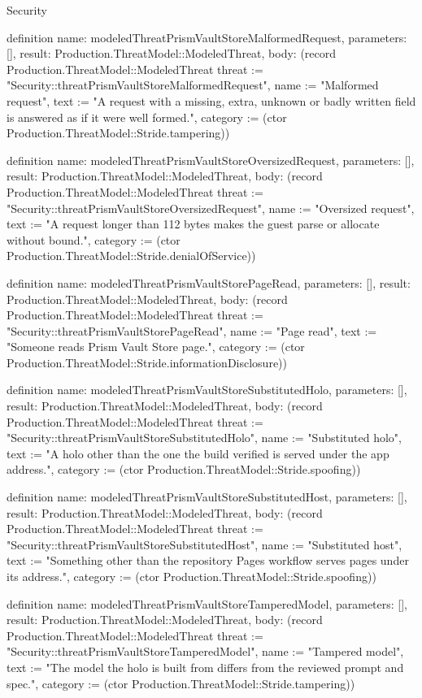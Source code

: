 \begin{lexlean}{Security}
\begin{semanticmodule}
definition{
  name: modeledThreatPrismVaultStoreMalformedRequest,
  parameters: [],
  result: Production.ThreatModel::ModeledThreat,
  body: (record Production.ThreatModel::ModeledThreat {threat := "Security::threatPrismVaultStoreMalformedRequest", name := "Malformed request", text := "A request with a missing, extra, unknown or badly written field is answered as if it were well formed.", category := (ctor Production.ThreatModel::Stride.tampering)})
}

definition{
  name: modeledThreatPrismVaultStoreOversizedRequest,
  parameters: [],
  result: Production.ThreatModel::ModeledThreat,
  body: (record Production.ThreatModel::ModeledThreat {threat := "Security::threatPrismVaultStoreOversizedRequest", name := "Oversized request", text := "A request longer than 112 bytes makes the guest parse or allocate without bound.", category := (ctor Production.ThreatModel::Stride.denialOfService)})
}

definition{
  name: modeledThreatPrismVaultStorePageRead,
  parameters: [],
  result: Production.ThreatModel::ModeledThreat,
  body: (record Production.ThreatModel::ModeledThreat {threat := "Security::threatPrismVaultStorePageRead", name := "Page read", text := "Someone reads Prism Vault Store page.", category := (ctor Production.ThreatModel::Stride.informationDisclosure)})
}

definition{
  name: modeledThreatPrismVaultStoreSubstitutedHolo,
  parameters: [],
  result: Production.ThreatModel::ModeledThreat,
  body: (record Production.ThreatModel::ModeledThreat {threat := "Security::threatPrismVaultStoreSubstitutedHolo", name := "Substituted holo", text := "A holo other than the one the build verified is served under the app address.", category := (ctor Production.ThreatModel::Stride.spoofing)})
}

definition{
  name: modeledThreatPrismVaultStoreSubstitutedHost,
  parameters: [],
  result: Production.ThreatModel::ModeledThreat,
  body: (record Production.ThreatModel::ModeledThreat {threat := "Security::threatPrismVaultStoreSubstitutedHost", name := "Substituted host", text := "Something other than the repository Pages workflow serves pages under its address.", category := (ctor Production.ThreatModel::Stride.spoofing)})
}

definition{
  name: modeledThreatPrismVaultStoreTamperedModel,
  parameters: [],
  result: Production.ThreatModel::ModeledThreat,
  body: (record Production.ThreatModel::ModeledThreat {threat := "Security::threatPrismVaultStoreTamperedModel", name := "Tampered model", text := "The model the holo is built from differs from the reviewed prompt and spec.", category := (ctor Production.ThreatModel::Stride.tampering)})
}


\end{semanticmodule}
\end{lexlean}

